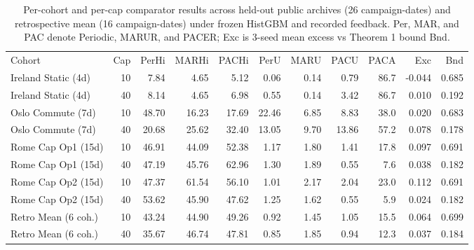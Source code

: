 \begin{table}[!ht]
\centering\small
\caption{Per-cohort and per-cap comparator results across held-out public archives (26 campaign-dates) and retrospective mean (16 campaign-dates) under frozen HistGBM and recorded feedback. Per, MAR, and PAC denote Periodic, MARUR, and PACER; Exc is 3-seed mean excess vs Theorem 1 bound Bnd.}
\begin{tabular}{lrrrrrrrrrr}
\hline
Cohort & Cap & PerHi & MARHi & PACHi & PerU & MARU & PACU & PACA & Exc & Bnd \\
Ireland Static (4d) & 10 & 7.84 & 4.65 & 5.12 & 0.06 & 0.14 & 0.79 & 86.7 & -0.044 & 0.685 \\
Ireland Static (4d) & 40 & 8.14 & 4.65 & 6.98 & 0.55 & 0.14 & 3.42 & 86.7 & 0.010 & 0.192 \\
Oslo Commute (7d) & 10 & 48.70 & 16.23 & 17.69 & 22.46 & 6.85 & 8.83 & 38.0 & 0.020 & 0.683 \\
Oslo Commute (7d) & 40 & 20.68 & 25.62 & 32.40 & 13.05 & 9.70 & 13.86 & 57.2 & 0.078 & 0.178 \\
Rome Cap Op1 (15d) & 10 & 46.91 & 44.09 & 52.38 & 1.17 & 1.80 & 1.41 & 17.8 & 0.097 & 0.691 \\
Rome Cap Op1 (15d) & 40 & 47.19 & 45.76 & 62.96 & 1.30 & 1.89 & 0.55 & 7.6 & 0.038 & 0.182 \\
Rome Cap Op2 (15d) & 10 & 47.37 & 61.54 & 56.10 & 1.01 & 2.17 & 2.04 & 23.0 & 0.112 & 0.691 \\
Rome Cap Op2 (15d) & 40 & 53.62 & 45.90 & 47.62 & 1.25 & 1.62 & 0.55 & 5.9 & 0.024 & 0.182 \\
Retro Mean (6 coh.) & 10 & 43.24 & 44.90 & 49.26 & 0.92 & 1.45 & 1.05 & 15.5 & 0.064 & 0.699 \\
Retro Mean (6 coh.) & 40 & 35.67 & 46.74 & 47.81 & 0.85 & 1.85 & 0.94 & 12.3 & 0.037 & 0.184 \\
\hline
\end{tabular}
\end{table}
